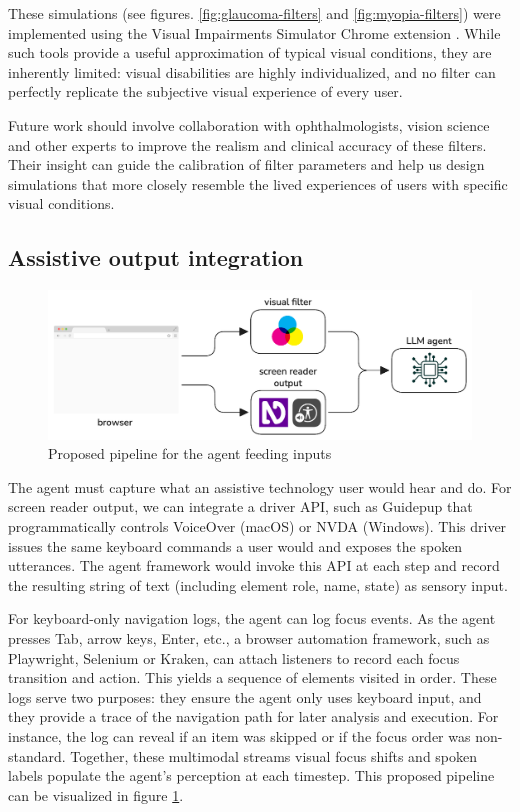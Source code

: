 These simulations (see figures. \ref{fig:glaucoma-filters} and \ref{fig:myopia-filters}) were implemented using the Visual Impairments Simulator Chrome extension \cite{visual_impairments_simulator}. While such tools provide a useful approximation of typical visual conditions, they are inherently limited: visual disabilities are highly individualized, and no filter can perfectly replicate the subjective visual experience of every user.

Future work should involve collaboration with ophthalmologists, vision science and other experts to improve the realism and clinical accuracy of these filters. Their insight can guide the calibration of filter parameters and help us design simulations that more closely resemble the lived experiences of users with specific visual conditions.

\subsection{Assistive output integration}

\begin{figure}
    \centering
    \includegraphics[width=1\linewidth]{imgs/flow.png}
\caption{Proposed pipeline for the agent feeding inputs}
\label{fig:pipeline}
\end{figure}


The agent must capture what an assistive technology user would hear and do. For screen reader output, we can integrate a driver API, such as Guidepup that programmatically controls VoiceOver (macOS) or NVDA (Windows). This driver issues the same keyboard commands a user would and exposes the spoken utterances\cite{guidepup2025}. The agent framework would invoke this API at each step and record the resulting string of text (including element role, name, state) as sensory input.

For keyboard-only navigation logs, the agent can log focus events. As the agent presses Tab, arrow keys, Enter, etc., a browser automation framework, such as Playwright, Selenium or Kraken, can attach listeners to record each focus transition and action. This yields a sequence of elements visited in order\cite{ravelo2023kraken}. These logs serve two purposes: they ensure the agent only uses keyboard input, and they provide a trace of the navigation path for later analysis and execution. For instance, the log can reveal if an item was skipped or if the focus order was non-standard. Together, these multimodal streams visual focus shifts and spoken labels populate the agent's perception at each timestep. This proposed pipeline can be visualized in figure \ref{fig:pipeline}.

